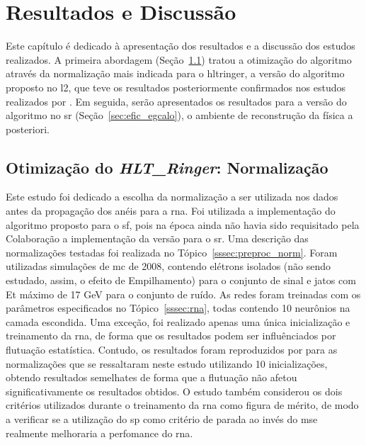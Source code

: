 \chapter{Resultados e Discussão}
\label{cap:resultados}

Este capítulo é dedicado à apresentação dos resultados e a discussão dos estudos
realizados. A primeira abordagem (Seção~\ref{sec:norm}) tratou a otimização do
algoritmo através da normalização mais indicada para o \gls{hltringer}, 
a versão do algoritmo proposto no \glsdesc{l2}, que teve os resultados 
posteriormente confirmados nos estudos realizados
por \cite{tese_torres}. Em seguida, serão apresentados os resultados para a
versão do algoritmo no \gls{sr} (Seção~\ref{sec:efic_egcalo}), o ambiente de
reconstrução da física a posteriori.


\section{Otimização do \emph{HLT\_Ringer}: Normalização}
\label{sec:norm}

Este estudo foi dedicado a escolha da normalização a ser utilizada nos
dados antes da propagação dos anéis para a \gls{rna}. Foi utilizada a
implementação do algoritmo proposto para o \gls{sf}, pois na época ainda não
havia sido requisitado pela Colaboração a implementação da versão para o \gls{sr}. Uma descrição das
normalizações testadas foi realizada no Tópico~\ref{sssec:preproc_norm}. Foram
utilizadas simulações de \gls{mc} de 2008, contendo elétrons isolados (não sendo
estudado, assim, o efeito de Empilhamento) para o conjunto de sinal e jatos com 
\gls{Et} máximo de 17 GeV para o conjunto de ruído. As redes foram treinadas com
os parâmetros especificados no Tópico~\ref{sssec:rna}, todas contendo 10
neurônios na camada escondida. Uma exceção, foi realizado apenas uma única 
inicialização e treinamento da \gls{rna}, de forma que os resultados
podem ser influênciados por flutuação estatística. Contudo, os resultados 
foram reproduzidos por \cite{tese_torres} para as normalizações que se ressaltaram 
neste estudo utilizando 10 inicializações, obtendo resultados semelhates de 
forma que a flutuação não afetou significativamente os resultados obtidos. O
estudo também considerou os dois critérios utilizados durante o treinamento da
\gls{rna} como figura de mérito, de modo a verificar se a utilização do \gls{sp}
como critério de parada ao invés do \gls{mse} realmente melhoraria a perfomance
do \gls{rna}.

